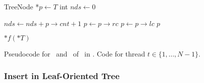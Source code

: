 \begin{algorithm}[htbp]
\begin{algorithmic}[1]
    \vspace*{1mm}
      \label{alg:ps:help:c:treenode-start}
        \State TreeNode *$\mathit{p} \gets T$
        \State int $\mathit{nds} \gets 0$
    
                \State $\mathit{nds} \gets \mathit{nds + p \rightarrow cnt + 1}$
                \State $\mathit{p} \gets p \rightarrow rc$
            \Else
                \State $\mathit{p} \gets p \rightarrow lc$
            \EndIf
        \EndWhile
        \State \Return $\mathit{p}$ \label{alg:ps:help:c:treenode-end}
    \EndProcedure
    
    \vspace*{1mm}
            \State \Return
        \EndIf
        \State {}
            \State $*f(*T)$
        \EndIf
        \State {}
    \EndProcedure
    
    \end{algorithmic}
    
    \caption{Pseudocode for \Put\ and \Traverse\ of \PS\ in \Fresh. Code for thread $t \in \{ 1, \ldots, N-1\}$.}
    \label{alg:ps}
    \end{algorithm}


    \subsubsection{Insert in Leaf-Oriented Tree}
    \label{sec:leaf-oriented}

